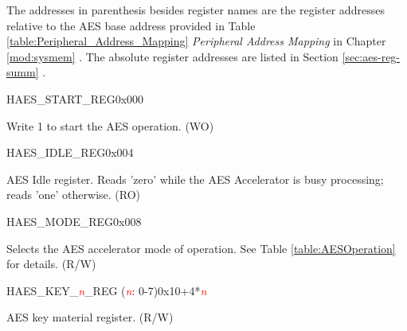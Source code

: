 The addresses in parenthesis besides register names are the register addresses relative to the AES base address provided in Table \ref{table:Peripheral_Address_Mapping} \textit{Peripheral Address Mapping} in Chapter \ref{mod:sysmem} \textit{}. The absolute register addresses are listed in Section \ref{sec:aes-reg-summ} \textit{}.

\begin{register}{H}{AES\_START\_REG}{0x000}\label{regdesc:AESSTARTREG}
%
%
\regnewline%
\begin{regdesc}\begin{reglist}
\item [AES\_START]Write 1 to start the AES operation. (WO)
\end{reglist}\end{regdesc}
\end{register}


\begin{register}{H}{AES\_IDLE\_REG}{0x004}\label{regdesc:AESIDLEREG}
%
%
\regnewline%
\begin{regdesc}\begin{reglist}
\item [AES\_IDLE]AES Idle register. Reads 'zero' while the AES Accelerator is busy processing; reads 'one' otherwise. (RO)
\end{reglist}\end{regdesc}
\end{register}


\begin{register}{H}{AES\_MODE\_REG}{0x008}\label{regdesc:AESMODEREG}
%
%
\regnewline%
\begin{regdesc}\begin{reglist}
\item [AES\_MODE]Selects the AES accelerator mode of operation. See Table \ref{table:AESOperation} for details. (R/W)
\end{reglist}\end{regdesc}
\end{register}


\begin{register}{H}{AES\_KEY\_\textcolor{red}{\it{n}}\_REG (\textcolor{red}{\it{n}}: 0-7)}{0x10+4*\textcolor{red}{\it{n}}}\label{regdesc:AESKEYnREG}
%
\regnewline%
\begin{regdesc}\begin{reglist}
\item [AES\_KEY\_\textit{\textcolor{red}{\it{n}}}\_REG (\textcolor{red}{\it{n}}: 0-7)]AES key material register. (R/W)
\end{reglist}\end{regdesc}
\end{register}



